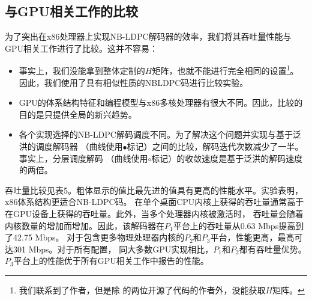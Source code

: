 \documentclass{cjc}
\begin{document}
\subsection{与GPU相关工作的比较}

  为了突出在x86处理器上实现NB-LDPC解码器的效率，我们将其吞吐量性能与GPU相关工作进行了比较。这并不容易：
\begin{itemize}
  \item 事实上，我们没能拿到整体定制的$H$矩阵，也就不能进行完全相同的设置\footnote{我们联系到了作者，但是除
  \cite{noauthor_andrade_nodate,liu_high-throughput_2018}的两位开源了代码的作者外，没能获取$H$矩阵。}。
  因此，我们使用了具有相似性质的NBLDPC码进行比较实验。
  \item GPU的体系结构特征和编程模型与x86多核处理器有很大不同。因此，比较的目的是只提供全局的新兴趋势。
  \item 各个实现选择的NB-LDPC解码调度不同。为了解决这个问题并实现与基于泛洪的调度解码器
  （曲线使用$\bullet$标记）之间的比较，解码迭代次数减少了一半。事实上，分层调度解码
  （曲线使用$\circ$标记）的收敛速度是基于泛洪的解码\cite{beermann_gpu_2015}速度的两倍。
\end{itemize}

  吞吐量比较见表5。粗体显示的值比最先进的值具有更高的性能水平。实验表明，x86体系结构更适合NB-LDPC码。
  在单个桌面CPU内核上获得的吞吐量通常高于在GPU设备上获得的吞吐量。此外，当多个处理器内核被激活时，
  吞吐量会随着内核数量的增加而增加。因此，该解码器在$P_1$平台上的吞吐量从0.63 Mbps提高到了42.75 Mbps。
  对于包含更多物理处理器内核的$P_2$和$P_3$平台，性能更高，最高可达301 Mbps。对于所有配置，
  同大多数GPU实现相比，$P_1$和$P_2$都有吞吐量优势。$P_3$平台上的性能优于所有GPU相关工作中报告的性能。

    
\end{document}

